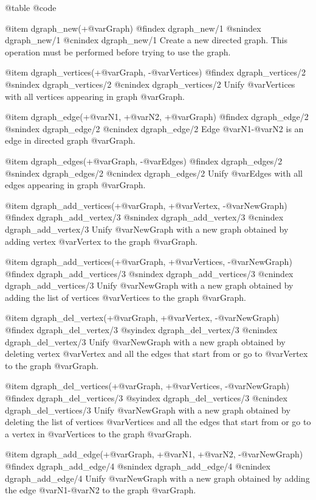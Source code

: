 @table @code

@item dgraph_new(+@var{Graph})
@findex  dgraph_new/1
@snindex dgraph_new/1
@cnindex dgraph_new/1
Create a new directed graph. This operation must be performed before
trying to use the graph.

@item dgraph_vertices(+@var{Graph}, -@var{Vertices})
@findex  dgraph_vertices/2
@snindex dgraph_vertices/2
@cnindex dgraph_vertices/2
Unify @var{Vertices} with all vertices appearing in graph
@var{Graph}.

@item dgraph_edge(+@var{N1}, +@var{N2}, +@var{Graph})
@findex  dgraph_edge/2
@snindex dgraph_edge/2
@cnindex dgraph_edge/2
Edge @var{N1}-@var{N2} is an edge in directed graph @var{Graph}.

@item dgraph_edges(+@var{Graph}, -@var{Edges})
@findex  dgraph_edges/2
@snindex dgraph_edges/2
@cnindex dgraph_edges/2
Unify @var{Edges} with all edges appearing in graph
@var{Graph}.

@item dgraph_add_vertices(+@var{Graph}, +@var{Vertex}, -@var{NewGraph})
@findex  dgraph_add_vertex/3
@snindex dgraph_add_vertex/3
@cnindex dgraph_add_vertex/3
Unify @var{NewGraph} with a new graph obtained by adding
vertex @var{Vertex} to the graph @var{Graph}.

@item dgraph_add_vertices(+@var{Graph}, +@var{Vertices}, -@var{NewGraph})
@findex  dgraph_add_vertices/3
@snindex dgraph_add_vertices/3
@cnindex dgraph_add_vertices/3
Unify @var{NewGraph} with a new graph obtained by adding the list of
vertices @var{Vertices} to the graph @var{Graph}.

@item dgraph_del_vertex(+@var{Graph}, +@var{Vertex}, -@var{NewGraph})
@findex  dgraph_del_vertex/3
@syindex dgraph_del_vertex/3
@cnindex dgraph_del_vertex/3
Unify @var{NewGraph} with a new graph obtained by deleting vertex
@var{Vertex} and all the edges that start from or go to @var{Vertex} to
the graph @var{Graph}.

@item dgraph_del_vertices(+@var{Graph}, +@var{Vertices}, -@var{NewGraph})
@findex  dgraph_del_vertices/3
@syindex dgraph_del_vertices/3
@cnindex dgraph_del_vertices/3
Unify @var{NewGraph} with a new graph obtained by deleting the list of
vertices @var{Vertices} and all the edges that start from or go to a
vertex in @var{Vertices} to the graph @var{Graph}.

@item dgraph_add_edge(+@var{Graph}, +@var{N1}, +@var{N2}, -@var{NewGraph})
@findex  dgraph_add_edge/4
@snindex dgraph_add_edge/4
@cnindex dgraph_add_edge/4
Unify @var{NewGraph} with a new graph obtained by adding the edge
@var{N1}-@var{N2} to the graph @var{Graph}.

